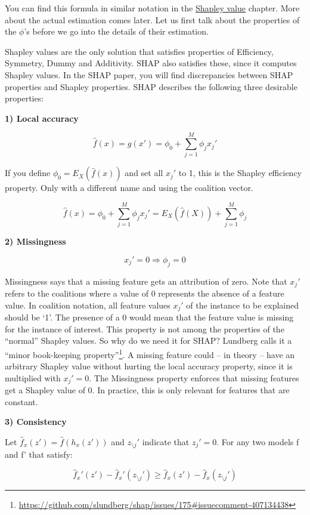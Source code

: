 \documentclass[
  11pt,
]{scrbook}
\renewcommand{\href}[2]{#2\footnote{\url{#1}}}
\begin{document}
You can find this formula in similar notation in the \protect\hyperlink{shapley}{Shapley value} chapter.
More about the actual estimation comes later.
Let us first talk about the properties of the \(\phi\)'s before we go into the details of their estimation.

Shapley values are the only solution that satisfies properties of Efficiency, Symmetry, Dummy and Additivity.
SHAP also satisfies these, since it computes Shapley values.
In the SHAP paper, you will find discrepancies between SHAP properties and Shapley properties.
SHAP describes the following three desirable properties:

\textbf{1) Local accuracy}

\[\hat{f}(x)=g(x')=\phi_0+\sum_{j=1}^M\phi_jx_j'\]

If you define \(\phi_0=E_X(\hat{f}(x))\) and set all \(x_j'\) to 1, this is the Shapley efficiency property.
Only with a different name and using the coalition vector.

\[\hat{f}(x)=\phi_0+\sum_{j=1}^M\phi_jx_j'=E_X(\hat{f}(X))+\sum_{j=1}^M\phi_j\]

\textbf{2) Missingness}

\[x_j'=0\Rightarrow\phi_j=0\]

Missingness says that a missing feature gets an attribution of zero.
Note that \(x_j'\) refers to the coalitions where a value of 0 represents the absence of a feature value.
In coalition notation, all feature values \(x_j'\) of the instance to be explained should be `1'.
The presence of a 0 would mean that the feature value is missing for the instance of interest.
This property is not among the properties of the ``normal'' Shapley values.
So why do we need it for SHAP?
Lundberg calls it a \href{https://github.com/slundberg/shap/issues/175\#issuecomment-407134438}{``minor book-keeping property''}.
A missing feature could -- in theory -- have an arbitrary Shapley value without hurting the local accuracy property, since it is multiplied with \(x_j'=0\).
The Missingness property enforces that missing features get a Shapley value of 0.
In practice, this is only relevant for features that are constant.

\textbf{3) Consistency}

Let \(\hat{f}_x(z')=\hat{f}(h_x(z'))\) and \(z_{\setminus{}j}'\) indicate that \(z_j'=0\).
For any two models f and f' that satisfy:

\[\hat{f}_x'(z')-\hat{f}_x'(z_{\setminus{}j}')\geq{}\hat{f}_x(z')-\hat{f}_x(z_{\setminus{}j}')\]
\end{document}
